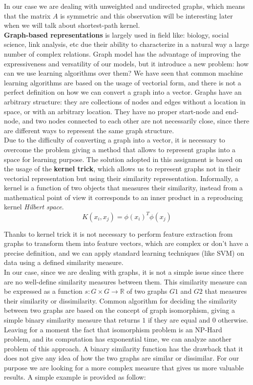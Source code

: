 \documentclass[11pt,a4paper]{article}
\begin{document}
In our case we are dealing with unweighted and undirected graphs, which means that the matrix $A$ is symmetric and this observation will be interesting later when we will talk about shortest-path kernel.\\
\textbf{Graph-based representations} is largely used in field like: biology, social science, link analysis, etc due their ability to characterize in a natural way a large number of complex relations. Graph model has the advantage of improving the expressiveness and versatility of our models, but it introduce a new problem: how can we use learning algorithms over them? We have seen that common machine learning algorithms are based on the usage of vectorial form, and there is not a perfect definition on how we can convert a graph into a vector. Graphs have an arbitrary structure: they are collections of nodes and edges without a location in space, or with an arbitrary location. They have no proper start-node and end-node, and two nodes connected to each other are not necessarily close, since there are different ways to represent the same graph structure.\\
Due to the difficulty of converting a graph into a vector, it is necessary to overcome the problem giving a method that allows to represent graphs into a space for learning purpose. 
The solution adopted in this assignment is based on the usage of the \textbf{kernel trick}, which allows us to represent graphs not in their vectorial representation but using their similarity representation. Informally, a kernel is a function of two objects that measures their similarity, instead from a mathematical point of view it corresponds to an inner product in a reproducing kernel \textit{Hilbert space}. 
$$K(x_i,x_j) = \phi(x_i)^T\phi(x_j)$$

Thanks to kernel trick it is not necessary to perform feature extraction from graphs to transform them into feature vectors, which are complex or don't have a precise definition, and we can apply standard learning techniques (like SVM) on data using a defined similarity measure.\\
In our case, since we are dealing with graphs, it is not a simple issue since there are no well-define similarity measures between them. 
This similarity measure can be expressed as a function $s: G\times G \rightarrow \mathbb{R}$ of two graphs $G1$ and $G2$ that measures their similarity or dissimilarity.
Common algorithm for deciding the similarity between two graphs are based on the concept of graph isomorphism, giving a simple binary similarity measure that returns $1$ if they are equal and $0$ otherwise. \\
Leaving for a moment the fact that isomorphism problem is an NP-Hard problem, and its computation has exponential time, we can analyze another problem of this approach.
A binary similarity function has the drawback that it does not give any idea of how the two graphs are similar or dissimilar. For our purpose we are looking for a more complex measure that gives us more valuable results. A simple example is provided as follow:
\end{document}
